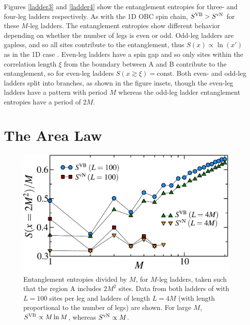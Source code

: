  Figures \ref{ladder3} and \ref{ladder4} show the entanglement entropies for three- and four-leg ladders respectively.
 As with the 1D OBC spin chain, $S^{\text{VB}} > S^{\text{vN}}$ for these $M$-leg ladders.
 The entanglement entropies show different behavior depending on whether the number of legs is even or odd.
 Odd-leg ladders are gapless, and so all sites contribute to the entanglement, thus
 $S(x) \propto \ln(x')$ as in the 1D case \cite{White1994}.
 Even-leg ladders have a spin gap and so only sites within the correlation length $\xi$ from the boundary between A and B contribute to the entanglement,
so for even-leg ladders $S(x\gtrsim\xi) = \text{const}$. 
Both even- and odd-leg ladders split into branches, as shown in the figure insets, though the even-leg ladders have a pattern with period $M$ whereas the odd-leg ladder entanglement entropies have a period of $2M$.  
 
\section{The Area Law}
\label{vbAlaw}

\begin{figure} { \includegraphics[width=6in]{./figures/paper1/figure4/4fig.pdf}
 \caption[Area law for \vn in 2D Heisenberg ground state, \vb shows a multiplicative logarithmic correction]{
Entanglement entropies divided by $M$,  for $M$-leg ladders, taken such that
the region A includes $2M^2$ sites.  
Data from both ladders of  with $L=100$ sites per leg and ladders of length $L=4M$ 
(with length proportional to the number of legs) are shown.
For large $M$, $S^{\rm VB}\propto M \ln M$,
whereas $S^{\rm vN}\propto M$.   
\label{zigzag}}} 
\end{figure}

